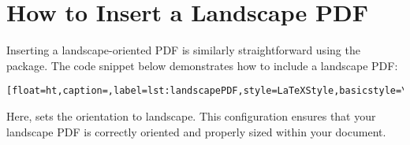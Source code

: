 		
	\section{How to Insert a Landscape PDF}
		Inserting a landscape-oriented PDF is similarly straightforward using the  package. 
		The code snippet below demonstrates how to include a landscape PDF:

		\begin{lstlisting}[float=ht,caption=,label=lst:landscapePDF,style=LaTeXStyle,basicstyle=\ttfamily,]

		\end{lstlisting}

		Here,  sets the orientation to landscape. 
		This configuration ensures that your landscape PDF is correctly oriented and properly sized within your document.

		